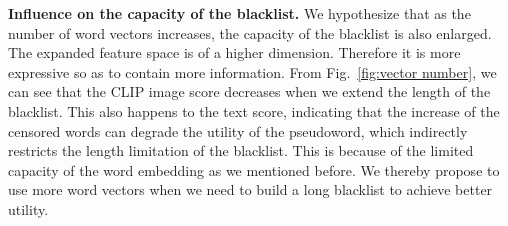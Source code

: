 \vspace{.3em}
\noindent \textbf{Influence on the capacity of the blacklist.} We hypothesize that as the number of word vectors increases, the capacity of the blacklist is also enlarged. The expanded feature space is of a higher dimension. Therefore it is more expressive so as to contain more information. From Fig.~\ref{fig:vector number}, we can see that the CLIP image score decreases when we extend the length of the blacklist. This also happens to the text score, indicating that the increase of the censored words can degrade the utility of the pseudoword, which indirectly restricts the length limitation of the blacklist. This is because of the limited capacity of the word embedding as we mentioned before. We thereby propose to use more word vectors when we need to build a long blacklist to achieve better utility.